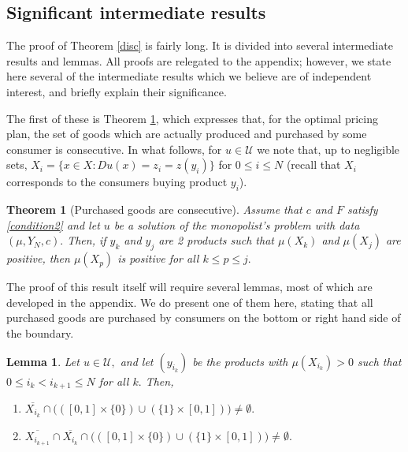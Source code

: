 \documentclass[12pt,reqno]{amsart}
\newtheorem{theorem}{Theorem}
\newtheorem{lem}{Lemma}
\begin{document}
\subsection{Significant intermediate results}  
The proof of Theorem \ref{disc} is fairly long.  It is divided into several intermediate results and lemmas.  All proofs are relegated to the appendix; however, we state here several of the intermediate results which we believe are of independent interest, and briefly explain their significance.

  
   The first of these is Theorem \ref{between}, which expresses that, for the optimal pricing plan, the set of goods which are actually produced and purchased by some consumer is consecutive.
   In what follows, for $u\in\mathcal{U}$ we  note that, up to negligible sets, $X_i=\{x\in X: Du(x)=z_i=z(y_i)\}$ for  $0\le i\le N$ (recall that $X_i$ corresponds to the consumers buying product $y_i$).


   
   \begin{theorem}[Purchased goods are consecutive]\label{between}
     Assume that $c$ and $F$ satisfy  \ref{condition2} and let $u$ be a solution of the monopolist's problem with data $(\mu, Y_N,c).$ Then, if $y_k$ and $y_j$ are 2 products such that $\mu( X_k)$ and $\mu( X_j)$ are positive, then $\mu( X_p)$ is positive for all $k\le p\le j.$ 
\end{theorem}
 The proof of this result itself will require several lemmas, most of which are developed in the appendix.  We do present one of them here, stating that all purchased goods are purchased by consumers on the bottom or right hand side of the boundary. %
\begin{lem}\label{partition}
    Let $u\in \mathcal{U},$ and let $(y_{i_k})$  be the products with $\mu(X_{i_k})>0$  such that $0\le i_k<i_{k+1}\le N$ for all $k.$ Then,
    \begin{enumerate}
      \item $\overline{X_{i_k}}\cap \Big(([0,1]\times\{0\}) \cup(\{1\}\times[0,1])\Big)\neq\emptyset.$
     \item $\overline{X_{i_{k+1}}}\cap\overline{X_{i_k}}\cap \Big(([0,1]\times\{0\}) \cup(\{1\}\times[0,1])\Big) \neq \emptyset.$
  
    \end{enumerate}
\end{lem}
 
\end{document}
